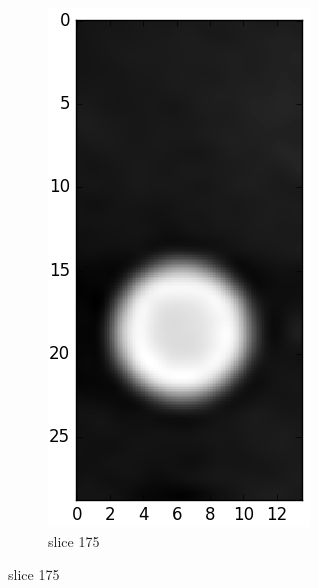 \begin{figure}[!tbh]
\centering
	\begin{subfigure}[b]{0.32\textwidth}
		\includegraphics[width=\linewidth]{../fig/python/ph2/brightness/ph2_CT_pane@175}
		\caption{slice 175}
		\label{fig:ph2_CT_x100_pane_0}

\end{subfigure}
\end{figure}
